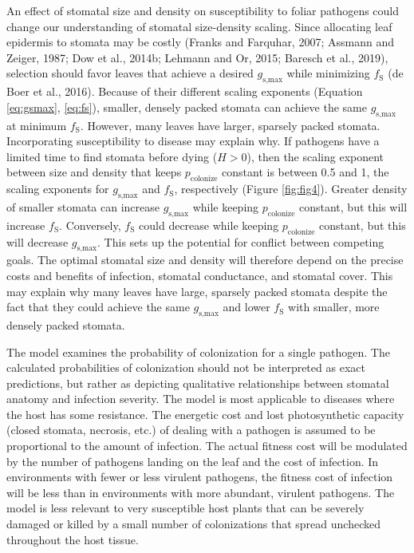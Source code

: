 \documentclass[utf8]{frontiersSCNS}
\newcommand{\fs}{$f_\text{S}$}
\newcommand{\gsmax}{$g_\text{s,max}$}
\begin{document}
An effect of stomatal size and density on susceptibility to foliar
pathogens could change our understanding of stomatal size-density
scaling. Since allocating leaf epidermis to stomata may be costly
(Franks and Farquhar, 2007; Assmann and Zeiger, 1987; Dow et al., 2014b;
Lehmann and Or, 2015; Baresch et al., 2019), selection should favor
leaves that achieve a desired \gsmax{} while minimizing \fs{} (de Boer
et al., 2016). Because of their different scaling exponents (Equation
\ref{eq:gsmax}, \ref{eq:fs}), smaller, densely packed stomata can
achieve the same \gsmax{} at minimum \fs. However, many leaves have
larger, sparsely packed stomata. Incorporating susceptibility to disease
may explain why. If pathogens have a limited time to find stomata before
dying (\(H > 0\)), then the scaling exponent between size and density
that keeps \(p_\text{colonize}\) constant is between 0.5 and 1, the
scaling exponents for \gsmax{} and \fs, respectively (Figure
\ref{fig:fig4}). Greater density of smaller stomata can increase
\gsmax{} while keeping \(p_\text{colonize}\) constant, but this will
increase \fs. Conversely, \fs{} could decrease while keeping
\(p_\text{colonize}\) constant, but this will decrease \gsmax. This sets
up the potential for conflict between competing goals. The optimal
stomatal size and density will therefore depend on the precise costs and
benefits of infection, stomatal conductance, and stomatal cover. This
may explain why many leaves have large, sparsely packed stomata despite
the fact that they could achieve the same \gsmax{} and lower \fs{} with
smaller, more densely packed stomata.

The model examines the probability of colonization for a single
pathogen. The calculated probabilities of colonization should not be
interpreted as exact predictions, but rather as depicting qualitative
relationships between stomatal anatomy and infection severity. The model
is most applicable to diseases where the host has some resistance. The
energetic cost and lost photosynthetic capacity (closed stomata,
necrosis, etc.) of dealing with a pathogen is assumed to be proportional
to the amount of infection. The actual fitness cost will be modulated by
the number of pathogens landing on the leaf and the cost of infection.
In environments with fewer or less virulent pathogens, the fitness cost
of infection will be less than in environments with more abundant,
virulent pathogens. The model is less relevant to very susceptible host
plants that can be severely damaged or killed by a small number of
colonizations that spread unchecked throughout the host tissue.
\end{document}
